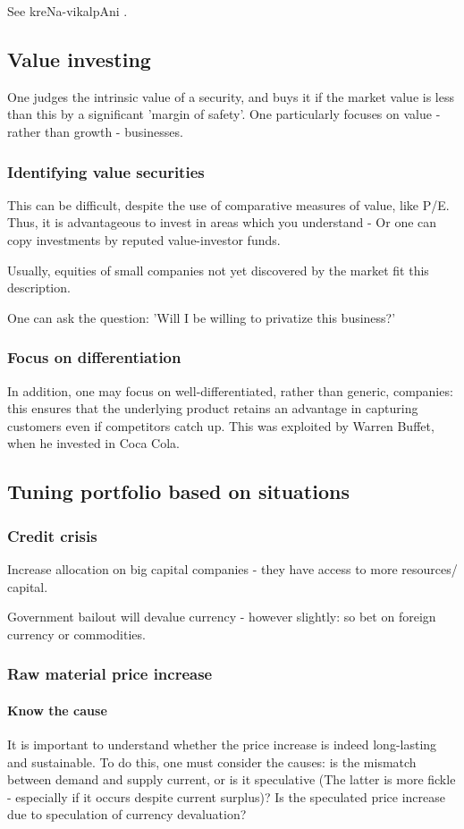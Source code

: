 \documentclass[oneside, article]{memoir}
\begin{document}
See kreNa-vikalpAni .


\subsection{Value investing}
One judges the intrinsic value of a security, and buys it if the market value is less than this by a significant 'margin of safety'. One particularly focuses on value - rather than growth - businesses.

\subsubsection{Identifying value securities}
This can be difficult, despite the use of comparative measures of value, like P/E. Thus, it is advantageous to invest in areas which you understand - Or one can copy investments by reputed value-investor funds.

Usually, equities of small companies not yet discovered by the market fit this description.

One can ask the question: 'Will I be willing to privatize this business?'

\subsubsection{Focus on differentiation}
In addition, one may focus on well-differentiated, rather than generic, companies: this ensures that the underlying product retains an advantage in capturing customers even if competitors catch up. This was exploited by Warren Buffet, when he invested in Coca Cola.

\subsection{Tuning portfolio based on situations}
\subsubsection{Credit crisis}
Increase allocation on big capital companies - they have access to more resources/ capital.

Government bailout will devalue currency - however slightly: so bet on foreign currency or commodities.

\subsubsection{Raw material price increase}
\paragraph{Know the cause}
It is important to understand whether the price increase is indeed long-lasting and sustainable. To do this, one must consider the causes: is the mismatch between demand and supply current, or is it speculative (The latter is more fickle - especially if it occurs despite current surplus)? Is the speculated price increase due to speculation of currency devaluation? 
\end{document}
